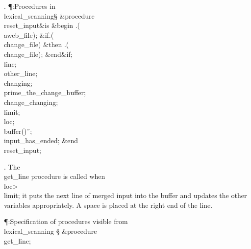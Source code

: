 . \P\?:Procedures in \\{lexical\_scanning}\X\mathrel{+}\S\?\6
\&{procedure}\8\1\\{reset\_input}\2\8\&{is}\8\1\6
\4\&{begin}\6
\?.\?\?\1(\?\\{aweb\_file}\?\2)\?;\6
\&{if}\1\1\8\?.\?\?\1(\?\\{change\_file}\?\2)\?\2\8%
\&{then}\6
\?.\?\?\1(\?\\{change\_file}\?\2)\?;\2\6
\&{end}\8\2\&{if}\1;\6
\\{line}\?\K{};\5
\\{other\_line}\?\K{};\6
\\{changing}\?\K\?;\5
\\{prime\_the\_change\_buffer};\5
\\{change\_changing};\6
\\{limit}\?\K{};\5
\\{loc}\?\K{};\5
\\{buffer}\?\1(\?\2)\K\?\H{\ };\5
\\{input\_has\_ended}\?\K\?;\2\6
\&{end}\8\\{reset\_input};\par
\fi

. The \\{get\_line} procedure is called when \\{loc}\?>\?\\{limit}; it puts
the next
line of merged input into the buffer and updates the other variables
appropriately. A space is placed at the right end of the line.

\Y\P\?\4:Specification of procedures visible from \\{lexical\_scanning}\X%
\mathrel{+}\S\?\6
\&{procedure}\8\1\\{get\_line}\2;\par
\fi

